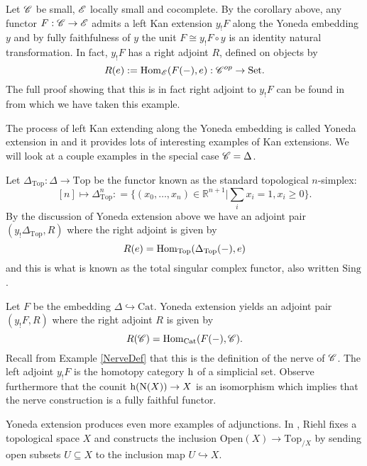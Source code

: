 \documentclass[../../thesis.tex]{subfiles}
\begin{document}
\begin{example}
    Let $\mathscr{C}$ be small, $\mathscr{E}$ locally small and cocomplete.
    By the corollary above, any functor $F: \mathscr{C} \to \mathscr{E}$ admits a left Kan extension $y_!F$ along the Yoneda embedding $y$ and by fully faithfulness of $y$ the unit $F \cong y_!F\circ y$ is an identity natural transformation.
    In fact, $y_!F$ has a right adjoint $R$, defined on objects by
    \[
        R(e) : = \mathrm{Hom}_{\mathscr{E}}(F({-}), e) : \mathscr{C}^{op} \to \mathrm{Set}.
    \]
    The full proof showing that this is in fact right adjoint to $y_!F$ can be found in \cite[Remark 6.5.9.]{CatContext} from which we have taken this example.
\end{example}
The process of left Kan extending along the Yoneda embedding is called Yoneda extension in \cite[pp.62-64]{CatsSheaves} and it provides lots of interesting examples of Kan extensions.
We will look at a couple examples in the special case $\mathscr{C} = \Delta$.
\begin{example}
    Let $\Delta_{\mathrm{Top}} : \Delta \to \mathrm{Top}$ be the functor known as the standard topological $n$-simplex:
    \[
        [n] \mapsto \Delta^n_{\mathrm{Top}} : = \{(x_0, \dots , x_n) \in \mathbb{R}^{n+1} | \sum_{i}x_i = 1, x_i \geq 0\}  .
    \]
    By the discussion of Yoneda extension above we have an adjoint pair $(y_!\Delta_{\mathrm{Top}}, R)$ where the right adjoint is given by
    \[
        R(e) = \mathrm{Hom}_{\mathrm{Top}}(\Delta_{\mathrm{Top}}({-}), e)
    \]
    and this is what is known as the total singular complex functor, also written $\mathrm{Sing}$.
\end{example}
\begin{example}\label{NerveKan}
    Let $F$ be the embedding $\Delta \hookrightarrow \mathrm{Cat}$.
    Yoneda extension yields an adjoint pair $(y_!F, R)$ where the right adjoint $R$ is given by
    \[
        R(\mathscr{C}) = \mathrm{Hom}_{\mathrm{Cat}}(F({-}), \mathscr{C}).
    \]
    Recall from Example \ref{NerveDef} that this is the definition of the nerve of $\mathscr{C}$.
    The left adjoint $y_!F$ is the homotopy category $\mathrm{h}$ of a simplicial set.
    Observe furthermore that the counit $\mathrm{h}(\mathrm{N}(X)) \to X$ is an isomorphism which implies that the nerve construction is a fully faithful functor.
\end{example}
Yoneda extension produces even more examples of adjunctions.
In \cite[Exercise 6.5.iii.]{CatContext}, Riehl fixes a topological space $X$ and constructs the inclusion $\mathrm{Open}(X) \to \mathrm{Top}_{/X}$ by sending open subsets $U \subseteq X$ to the inclusion map $U\hookrightarrow X$.
\end{document}
